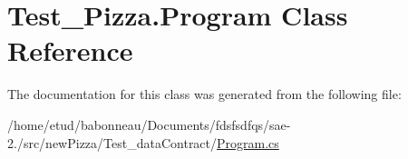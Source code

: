 \hypertarget{classTest__Pizza_1_1Program}{}\section{Test\+\_\+\+Pizza.\+Program Class Reference}
\label{classTest__Pizza_1_1Program}


The documentation for this class was generated from the following file\+:\begin{DoxyCompactItemize}
\item 
/home/etud/babonneau/\+Documents/fdsfsdfqs/sae-\/2./src/new\+Pizza/\+Test\+\_\+data\+Contract/\hyperlink{newPizza_2Test__dataContract_2Program_8cs}{Program.\+cs}\end{DoxyCompactItemize}
